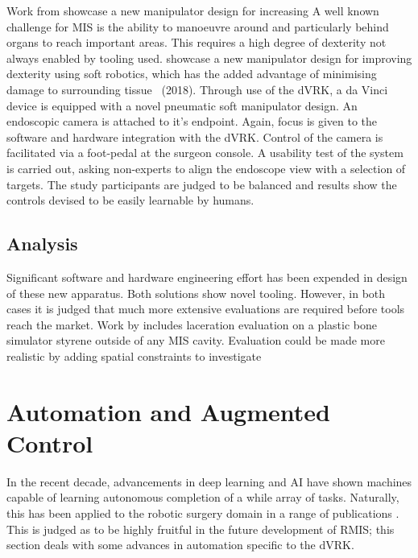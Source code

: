 \documentclass[english]{sobraep}
\begin{document}
Work from \citeauthor{soft-manip} showcase a new manipulator design for increasing 
A well known challenge for MIS is the ability to manoeuvre around and particularly behind organs to reach important areas. This requires a high degree of dexterity not always enabled by tooling used. \citeauthor{soft-manip} showcase a new manipulator design for improving dexterity using soft robotics, which has the added advantage of minimising damage to surrounding tissue~\cite{soft-manip} (2018). Through use of the dVRK, a da Vinci device is equipped with a novel pneumatic soft manipulator design. An endoscopic camera is attached to it's endpoint. Again, focus is given to the software and hardware integration with the dVRK. Control of the camera is facilitated via a foot-pedal at the surgeon console. A usability test of the system is carried out, asking non-experts to align the endoscope view with a selection of targets. The study participants are judged to be balanced and results show the controls devised to be easily learnable by humans.  



\subsection{Analysis}
Significant software and hardware engineering effort has been expended in design of these new apparatus. Both solutions show novel tooling. However, in both cases it is judged that much more extensive evaluations are required before tools reach the market. Work by \citeauthor{bone-cutter} includes laceration evaluation on a plastic bone simulator styrene outside of any MIS cavity. Evaluation could be made more realistic by adding spatial constraints to investigate 


\section{Automation and Augmented Control}\label{sec:Automation}
In the recent decade, advancements in deep learning and AI have shown machines capable of learning autonomous completion of a while array of tasks. Naturally, this has been applied to the robotic surgery domain in a range of publications \cite{shitloads}. This is judged as to be highly fruitful in the future development of RMIS; this section deals with some advances in automation specific to the dVRK. 

\end{document}
